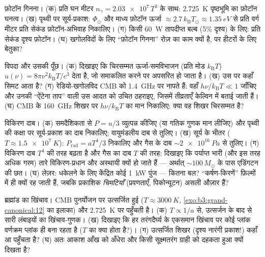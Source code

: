 \begin{exercise}[$\star$]\label{exo:b3:photons-phonons:3}
फ़ोटॉन गिनना। (क) प्रति घन मीटर $n_\gamma = \num{2.03e7}\,T^3$ के
साथ: \qty{2.725}{K} पृष्ठभूमि का फ़ोटॉन घनत्व।
(ख) पृथ्वी पर सूर्य-प्रकाश: $\Phi_\odot$ और माध्य फ़ोटॉन ऊर्जा
$\approx 2.7\,k_{\text{B}}T_\odot \approx \qty{1.35}{eV}$ से
प्रति वर्ग मीटर प्रति सेकंड फ़ोटॉन-अभिवाह निकालिए। (ग) किसी
\qty{60}{W} तापदीप्त बल्ब (5\% दृश्य) के लिए: प्रति सेकंड दृश्य
फ़ोटॉन। (घ) खगोलविदों के लिए ``फ़ोटॉन गिनना'' रोज़ का काम क्यों है,
पर हीटरों के लिए बेतुका?
\end{exercise}

\begin{exercise}[$\star$]\label{exo:b3:photons-phonons:4}
विपदा और उसकी पूँछ। (क) दिखाइए कि चिरसम्मत ऊर्जा-समविभाजन
(प्रति मोड $k_{\text{B}}T$) $u(\nu) =
8\pi\nu^2k_{\text{B}}T/c^3$ देता है, जो समाकलित करने पर अपसरित हो
जाता है। (ख)  उस पर कहाँ सिमट आता है? (ग)
रेडियो-खगोलविद CMB को \qty{1.4}{GHz} पर नापते हैं: वहाँ
$h\nu/k_{\text{B}}T \ll 1$ जाँचिए और उनकी ``ऐंटेना ताप'' वाली उस
आदत को उचित ठहराइए, जिसमें तीव्रताएँ केल्विन में बताई जाती हैं। (घ)
CMB के \qty{160}{GHz} शिखर पर
$h\nu/k_{\text{B}}T$ का मान निकालिए: क्या वह शिखर चिरसम्मत है?
\end{exercise}

\begin{exercise}[$\star\star$]\label{exo:b3:photons-phonons:5}
विकिरण दाब। (क) समदैशिकता से $P = u/3$ व्युत्पन्न कीजिए (या गतिक
गुणक मान लीजिए) और पृथ्वी की कक्षा पर सूर्य-प्रकाश का दाब निकालिए;
वायुमंडलीय दाब से तुलिए। (ख) सूर्य के भीतर
($T \approx \qty{1.5e7}{K}$): $P_{\text{rad}} =
aT^4/3$ निकालिए और गैस के दाब $\sim\qty{2e16}{Pa}$ से तुलिए।
(ग) विकिरण दाब $T^4$ की तरह बढ़ता है और गैस का दाब $T$ की तरह:
दिखाइए कि पर्याप्त भारी (और इस तरह अधिक गरम) तारे
विकिरण-प्रधान और अस्थायी क्यों हो जाते हैं --- अर्थात्
$\sim100\,M_\odot$ के पास एडिंगटन की छत। (घ) लेज़र: धकेलने के लिए
केंद्रित कोई \qty{1}{kW} पुंज --- कितना बल? ``कर्षण-किरणें'' फ़िल्मों
में ही क्यों रह जाती हैं, जबकि प्रकाशिक \emph{चिमटियाँ} (प्रवणताएँ,
पिकोन्यूटन) असली औज़ार हैं?
\end{exercise}

\begin{exercise}[$\star\star$]\label{exo:b3:photons-phonons:6}
ब्रह्मांड का खिंचाव। CMB पुनर्योजन पर उत्सर्जित हुई
($T \approx \qty{3000}{K}$, \cref{exo:b3:grand-canonical:12} का
इलाका) और \qty{2.725}{K} पर पहुँचती है। (क) $T \propto
1/a$ से, उत्सर्जन के बाद से सारी लंबाइयों का खिंचाव-गुणक। (ख)
दिखाइए कि हर तरंगदैर्घ्य के एकसमान खिंचाव पर कोई प्लांक वर्णक्रम
प्लांक ही बना रहता है ($T$ का क्या होता है?)। (ग) उत्सर्जित शिखर
(दृश्य नारंगी प्रकाश!) कहाँ आ पहुँचता है? (घ) अतः आकाश आँख को
अँधेरा और किसी सूक्ष्मतरंग ग्राही को दहकता हुआ क्यों दिखता है?
\end{exercise}

